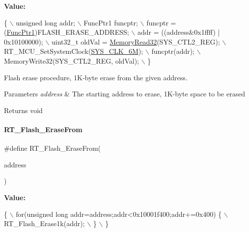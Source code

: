 {\bfseries Value\+:}
\begin{DoxyCode}
\{                                                   \(\backslash\)
        unsigned \textcolor{keywordtype}{long} addr;                             \(\backslash\)
        FuncPtr1 funcptr;                               \(\backslash\)
        funcptr =  (\mbox{\hyperlink{a00020_a0891965816a5b721b07f7bebefaf7430}{FuncPtr1}})FLASH\_ERASE\_ADDRESS;       \(\backslash\)
        addr = ((address&0x1ffff) | 0x10100000);        \(\backslash\)
        uint32\_t oldVal = \mbox{\hyperlink{a00020_a706b02571285f92589fbb0b964d7d0bb}{MemoryRead32}}(SYS\_CTL2\_REG);   \(\backslash\)
        RT\_MCU\_SetSystemClock(\mbox{\hyperlink{a00020_ae3a2d501b8662e11b969fb4a5e195e5bad1640aa8c46162a7551abca12293ef39}{SYS\_CLK\_6M}});              \(\backslash\)
        funcptr(addr);                                  \(\backslash\)
        MemoryWrite32(SYS\_CTL2\_REG, oldVal);            \(\backslash\)
    \}
\end{DoxyCode}


Flash erase procedure, 1\+K-\/byte erase from the given address. 


\begin{DoxyParams}{Parameters}
{\em address} & The starting address to erase, 1\+K-\/byte space to be erased \\
\hline
\end{DoxyParams}
\begin{DoxyReturn}{Returns}
void 
\end{DoxyReturn}
\mbox{\label{a00008_afb9cdf54d7254cfef685cd4012113b27}} 
\paragraph{\texorpdfstring{R\+T\+\_\+\+Flash\+\_\+\+Erase\+From}{RT\_Flash\_EraseFrom}}
{\footnotesize\ttfamily \#define R\+T\+\_\+\+Flash\+\_\+\+Erase\+From(\begin{DoxyParamCaption}\item[{}]{address }\end{DoxyParamCaption})}

{\bfseries Value\+:}
\begin{DoxyCode}
\{                                                                   \(\backslash\)
        for(\textcolor{keywordtype}{unsigned} \textcolor{keywordtype}{long} addr=address;addr<0x10001f400;addr+=0x400) \{  \(\backslash\)
            RT\_Flash\_Erase1k(addr);                                     \(\backslash\)
        \}                                                               \(\backslash\)
    \}
\end{DoxyCode}


